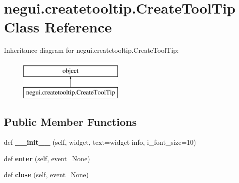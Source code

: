 \hypertarget{classnegui_1_1createtooltip_1_1CreateToolTip}{}\section{negui.\+createtooltip.\+Create\+Tool\+Tip Class Reference}
\label{classnegui_1_1createtooltip_1_1CreateToolTip}
Inheritance diagram for negui.\+createtooltip.\+Create\+Tool\+Tip\+:\begin{figure}[H]
\begin{center}
\leavevmode
\includegraphics[height=2.000000cm]{classnegui_1_1createtooltip_1_1CreateToolTip}
\end{center}
\end{figure}
\subsection*{Public Member Functions}
\begin{DoxyCompactItemize}
\item 
def {\bfseries \+\_\+\+\_\+init\+\_\+\+\_\+} (self, widget, text=\textquotesingle{}widget info\textquotesingle{}, i\+\_\+font\+\_\+size=10)\hypertarget{classnegui_1_1createtooltip_1_1CreateToolTip_aec360f7f4bfc95876b04ad68a7c54140}{}\label{classnegui_1_1createtooltip_1_1CreateToolTip_aec360f7f4bfc95876b04ad68a7c54140}

\item 
def {\bfseries enter} (self, event=None)\hypertarget{classnegui_1_1createtooltip_1_1CreateToolTip_ab37624e73833e8ba485d10410c5986bb}{}\label{classnegui_1_1createtooltip_1_1CreateToolTip_ab37624e73833e8ba485d10410c5986bb}

\item 
def {\bfseries close} (self, event=None)\hypertarget{classnegui_1_1createtooltip_1_1CreateToolTip_aa6f6887d11b3e07e5f6e12b267412fae}{}\label{classnegui_1_1createtooltip_1_1CreateToolTip_aa6f6887d11b3e07e5f6e12b267412fae}

\end{DoxyCompactItemize}
